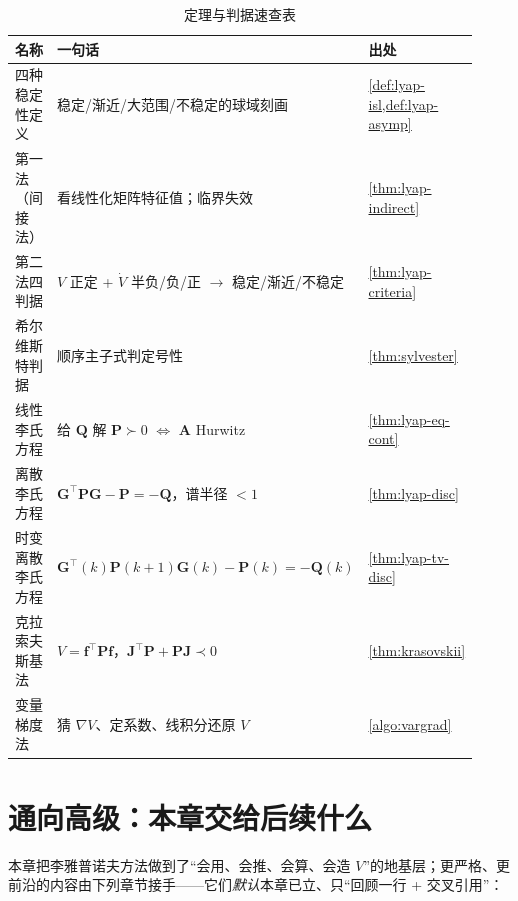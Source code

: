 \begin{table}[H]\centering\small
\caption{定理与判据速查表}
\begin{tabular}{p{0.30\linewidth}p{0.40\linewidth}p{0.22\linewidth}}
\toprule
名称 & 一句话 & 出处 \\
\midrule
四种稳定性定义 & 稳定/渐近/大范围/不稳定的球域刻画 & \cref{def:lyap-isl,def:lyap-asymp} \\
第一法（间接法） & 看线性化矩阵特征值；临界失效 & \cref{thm:lyap-indirect} \\
第二法四判据 & $V$ 正定 + $\dot V$ 半负/负/正 $\to$ 稳定/渐近/不稳定 & \cref{thm:lyap-criteria} \\
希尔维斯特判据 & 顺序主子式判定号性 & \cref{thm:sylvester} \\
线性李氏方程 & 给 $\mathbf{Q}$ 解 $\mathbf{P}\succ0$ $\iff$ $\mathbf{A}$ Hurwitz & \cref{thm:lyap-eq-cont} \\
离散李氏方程 & $\mathbf{G}^\top\mathbf{P}\mathbf{G}-\mathbf{P}=-\mathbf{Q}$，谱半径 $<1$ & \cref{thm:lyap-disc} \\
时变离散李氏方程 & $\mathbf{G}^\top(k)\mathbf{P}(k{+}1)\mathbf{G}(k)-\mathbf{P}(k)=-\mathbf{Q}(k)$ & \cref{thm:lyap-tv-disc} \\
克拉索夫斯基法 & $V=\mathbf{f}^\top\mathbf{P}\mathbf{f}$，$\mathbf{J}^\top\mathbf{P}+\mathbf{P}\mathbf{J}\prec0$ & \cref{thm:krasovskii} \\
变量梯度法 & 猜 $\nabla V$、定系数、线积分还原 $V$ & \cref{algo:vargrad} \\
\bottomrule
\end{tabular}
\end{table}

\section*{通向高级：本章交给后续什么}
\label{sec:lyap-bridge-up}

本章把李雅普诺夫方法做到了“会用、会推、会算、会造 $V$”的地基层；更严格、更前沿的内容由下列章节接手——它们\emph{默认}本章已立、只“回顾一行 + 交叉引用”：

